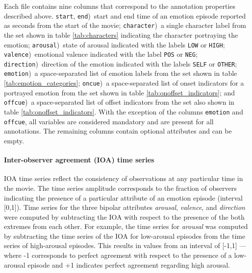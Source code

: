 \documentclass[10pt,a4paper,twocolumn]{article}
\begin{document}
Each file contains nine columns that correspond to the annotation properties
described above. \texttt{start}, \texttt{end})~start and end time of an emotion
episode reported as seconds from the start of the movie; \texttt{character})~a
single character label from the set shown in table \ref{tab:characters}
indicating the character portraying the emotion; \texttt{arousal})~state of
arousal indicated with the labels \texttt{LOW} or \texttt{HIGH};
\texttt{valence})~emotional valence indicated with the label \texttt{POS} or
\texttt{NEG}; \texttt{direction})~direction of the emotion indicated with the
labels \texttt{SELF} or \texttt{OTHER}; \texttt{emotion})~a space-separated list
of emotion labels from the set shown in table \ref{tab:emotion_categories};
\texttt{oncue})~a space-separated list of onset indicators for a portrayed
emotion from the set shown in table \ref{tab:onoffset_indicators}; and
\texttt{offcue})~a space-separated list of offset indicators from the set also
shown in table \ref{tab:onoffset_indicators}. With the exception of the
columns \texttt{emotion} and \texttt{offcue}, all variables are considered
mandatory and are present for all annotations. The remaining columns contain
optional attributes and can be empty.

\paragraph{Inter-observer agreement (IOA) time series} IOA time series reflect
the consistency of observations at any particular time in the movie. The time
series amplitude corresponds to the fraction of observers indicating the
presence of a particular attribute of an emotion episode (interval [0,1]). Time
series for the three bipolar attributes \textit{arousal}, \textit{valence}, and
\textit{direction} were computed by subtracting the IOA with respect to the
presence of the both extremes from each other. For example, the time series
for \textit{arousal} was computed by subtracting the time series of the IOA for
low-arousal episodes from the time series of high-arousal episodes. This
results in values from an interval of [-1,1] --- where -1 corresponds to perfect
agreement with respect to the presence of a low-arousal episode and +1 indicates
perfect agreement regarding high arousal.
\end{document}
